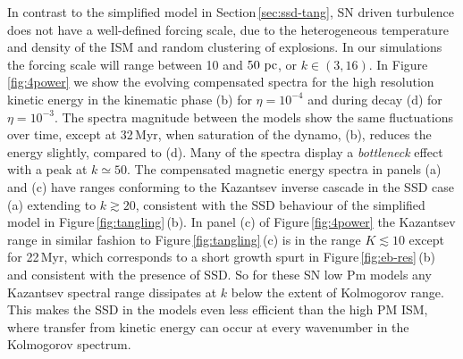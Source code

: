 \documentclass[preprint2]{aastex63}
\newcommand\pc{~ {\rm pc}}
\begin{document}
In contrast to the simplified model in Section\,\ref{sec:ssd-tang}, SN driven
turbulence does not have a well-defined forcing scale, due to the heterogeneous
temperature and density of the ISM and random clustering of explosions.
In our simulations the forcing scale will range between 10 and $50\pc$,
or $k\in(3,16)$.
In Figure\,\ref{fig:4power} we show the evolving compensated spectra for the
high resolution kinetic energy in the kinematic phase (b) for $\eta=10^{-4}$
and during decay (d) for $\eta=10^{-3}$.
The spectra magnitude between the models show the same fluctuations over time,
except at 32\,Myr, when saturation of the dynamo, (b), reduces
the energy slightly, compared to (d). 
Many of the spectra display a \emph{bottleneck} effect
\citep{Falkovich94,HBD03} with a peak at $k\simeq50$.
The compensated magnetic energy spectra in panels (a) and (c) have ranges 
conforming to the Kazantsev inverse cascade in the SSD case (a) extending to
$k\gtrsim 20$, consistent with the SSD behaviour of the simplified model in
Figure\,\ref{fig:tangling}\,(b).
In panel (c) of Figure\,\ref{fig:4power} the Kazantsev range in similar fashion
to Figure\,\ref{fig:tangling}\,(c) is in the range $K\lesssim10$ except
for 22\,Myr, which corresponds to a short growth spurt in
Figure\,\ref{fig:eb-res}\,(b) and consistent with the presence of SSD.
So for these SN low Pm models any Kazantsev spectral range dissipates 
at $k$ below the extent of Kolmogorov range.
This makes the SSD in the models even less efficient than the high PM ISM,
where transfer from kinetic energy can occur at every wavenumber in the
Kolmogorov spectrum.
\end{document}
